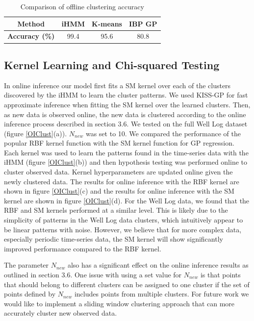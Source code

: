 \documentclass{article}
\begin{document}
\begin{table}[]
\centering
\caption{Comparison of offline clustering accuracy}
\label{OFACC}
\begin{tabular}{|c|c|c|c|}
\hline
\textbf{Method}        & iHMM & K-means & IBP GP \\ \hline
\textbf{Accuracy (\%)} & 99.4 & 95.6    & 80.8   \\ \hline
\end{tabular}
\end{table}

\subsection{Kernel Learning and Chi-squared Testing}

In online inference our model first fits a SM kernel over each of the clusters discovered by the iHMM to learn the cluster patterns. We used KISS-GP for fast approximate inference when fitting the SM kernel over the learned clusters. Then, as new data is observed online, the new data is clustered according to the online inference process described in section 3.6. We tested on the full Well Log dataset (figure \ref{OIClust}(a)). $N_{new}$ was set to 10. We compared the performance of the popular RBF kernel function with the SM kernel function for GP regression. Each kernel was used to learn the patterns found in the time-series data with the iHMM (figure \ref{OIClust}(b)) and then hypothesis testing was performed online to cluster observed data. Kernel hyperparameters are updated online given the newly clustered data. The results for online inference with the RBF kernel are shown in figure \ref{OIClust}(c) and the results for online inference with the SM kernel are shown in figure \ref{OIClust}(d). For the Well Log data, we found that the RBF and SM kernels performed at a similar level. This is likely due to the simplicity of patterns in the Well Log data clusters, which intuitively appear to be linear patterns with noise. However, we believe that for more complex data, especially periodic time-series data, the SM kernel will show significantly improved performance compared to the RBF kernel. 

The parameter $N_{new}$ also has a significant effect on the online inference results as outlined in section 3.6. One issue with using a set value for $N_{new}$ is that points that should belong to different clusters can be assigned to one cluster if the set of points defined by $N_{new}$ includes points from multiple clusters. For future work we would like to implement a sliding window clustering approach that can more accurately cluster new observed data.
\end{document}
